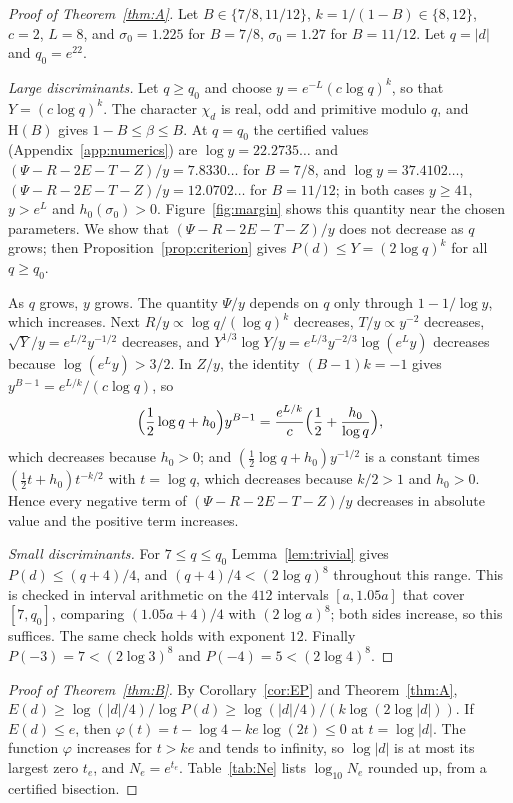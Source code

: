 \documentclass[11pt]{amsart}
\theoremstyle{definition}
\theoremstyle{remark}
\numberwithin{equation}{section}
\newcommand{\Hyp}{\mathrm{H}}
\begin{document}
\begin{proof}[Proof of Theorem~\ref{thm:A}]
Let $B\in\{7/8,11/12\}$, $k=1/(1-B)\in\{8,12\}$, $c=2$, $L=8$, and $\sigma_0=1.225$ for $B=7/8$, $\sigma_0=1.27$ for $B=11/12$. Let $q=|d|$ and $q_0=e^{22}$.

\emph{Large discriminants.} Let $q\ge q_0$ and choose $y=e^{-L}(c\log q)^k$, so that $Y=(c\log q)^k$. The character $\chi_d$ is real, odd and primitive modulo $q$, and $\Hyp(B)$ gives $1-B\le\beta\le B$. At $q=q_0$ the certified values (Appendix~\ref{app:numerics}) are $\log y=22.2735\ldots$ and $(\Psi-R-2E-T-Z)/y=7.8330\ldots$ for $B=7/8$, and $\log y=37.4102\ldots$, $(\Psi-R-2E-T-Z)/y=12.0702\ldots$ for $B=11/12$; in both cases $y\ge41$, $y>e^L$ and $h_0(\sigma_0)>0$. Figure~\ref{fig:margin} shows this quantity near the chosen parameters. We show that $(\Psi-R-2E-T-Z)/y$ does not decrease as $q$ grows; then Proposition~\ref{prop:criterion} gives $P(d)\le Y=(2\log q)^k$ for all $q\ge q_0$.

As $q$ grows, $y$ grows. The quantity $\Psi/y$ depends on $q$ only through $1-1/\log y$, which increases. Next $R/y\propto\log q/(\log q)^k$ decreases, $T/y\propto y^{-2}$ decreases, $\sqrt Y/y=e^{L/2}y^{-1/2}$ decreases, and $Y^{1/3}\log Y/y=e^{L/3}y^{-2/3}\log(e^Ly)$ decreases because $\log(e^Ly)>3/2$. In $Z/y$, the identity $(B-1)k=-1$ gives $y^{B-1}=e^{L/k}/(c\log q)$, so
\[
\Bigl(\frac12\log q+h_0\Bigr)y^{B-1}=\frac{e^{L/k}}{c}\Bigl(\frac12+\frac{h_0}{\log q}\Bigr),
\]
which decreases because $h_0>0$; and $(\frac12\log q+h_0)y^{-1/2}$ is a constant times $(\frac12t+h_0)t^{-k/2}$ with $t=\log q$, which decreases because $k/2>1$ and $h_0>0$. Hence every negative term of $(\Psi-R-2E-T-Z)/y$ decreases in absolute value and the positive term increases.

\emph{Small discriminants.} For $7\le q\le q_0$ Lemma~\ref{lem:trivial} gives $P(d)\le(q+4)/4$, and $(q+4)/4<(2\log q)^8$ throughout this range. This is checked in interval arithmetic on the $412$ intervals $[a,1.05a]$ that cover $[7,q_0]$, comparing $(1.05a+4)/4$ with $(2\log a)^8$; both sides increase, so this suffices. The same check holds with exponent $12$. Finally $P(-3)=7<(2\log3)^8$ and $P(-4)=5<(2\log4)^8$.
\end{proof}

\begin{proof}[Proof of Theorem~\ref{thm:B}]
By Corollary~\ref{cor:EP} and Theorem~\ref{thm:A}, $E(d)\ge\log(|d|/4)/\log P(d)\ge\log(|d|/4)/(k\log(2\log|d|))$. If $E(d)\le e$, then $\varphi(t)=t-\log4-ke\log(2t)\le0$ at $t=\log|d|$. The function $\varphi$ increases for $t>ke$ and tends to infinity, so $\log|d|$ is at most its largest zero $t_e$, and $N_e=e^{t_e}$. Table~\ref{tab:Ne} lists $\log_{10}N_e$ rounded up, from a certified bisection.
\end{proof}
\end{document}
